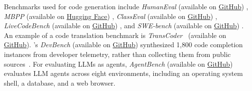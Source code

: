 \documentclass[smallextended]{svjour3}
\begin{document}
Benchmarks used for code generation include \emph{HumanEval} (available on \href{https://github.com/openai/human-eval}{GitHub}) \cite{DBLP:journals/corr/abs-2107-03374}, \emph{MBPP} (available on \href{https://huggingface.co/datasets/google-research-datasets/mbpp}{Hugging Face}) \cite{DBLP:journals/corr/abs-2108-07732},
\emph{ClassEval} (available on \href{https://github.com/FudanSELab/ClassEval}{GitHub}) \cite{DBLP:conf/icse/Du0WWL0FS0L24}, \emph{LiveCodeBench} (available on \href{https://github.com/LiveCodeBench/LiveCodeBench}{GitHub}) \cite{DBLP:journals/corr/abs-2403-07974}, and \emph{SWE-bench} (available on \href{https://github.com/swe-bench/SWE-bench}{GitHub}) \cite{DBLP:conf/iclr/JimenezYWYPPN24}.
An example of a code translation benchmark is \emph{TransCoder}~\cite{DBLP:conf/nips/RoziereLCL20} (available on \href{https://github.com/facebookresearch/CodeGen}{GitHub}).
\citeauthor{DBLP:journals/corr/abs-2601-11895}'s \emph{DevBench} (available on \href{https://github.com/microsoft/devbench}{GitHub}) synthesized 1,800 code completion instances from developer telemetry, rather than collecting them from public sources~\cite{DBLP:journals/corr/abs-2601-11895}.
For evaluating LLMs as agents, \emph{AgentBench} (available on \href{https://github.com/THUDM/AgentBench}{GitHub})~\cite{DBLP:conf/iclr/0036YZXLL0DMYZ024} evaluates LLM agents across eight environments, including an operating system shell, a database, and a web browser.
\end{document}
